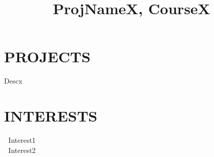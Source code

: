 \documentclass[margin]{res}
\newcommand{\tb}{\textbullet \xspace}
\begin{document}
\begin{resume}
\section{PROJECTS}
\title{\textbf{ProjNameX,} CourseX}
\begin{position}
\tb Descx
\end{position}


\section{INTERESTS}
􏰚\tb Interest1 \\
􏰚\tb Interest2

\end{resume}
\end{document}
